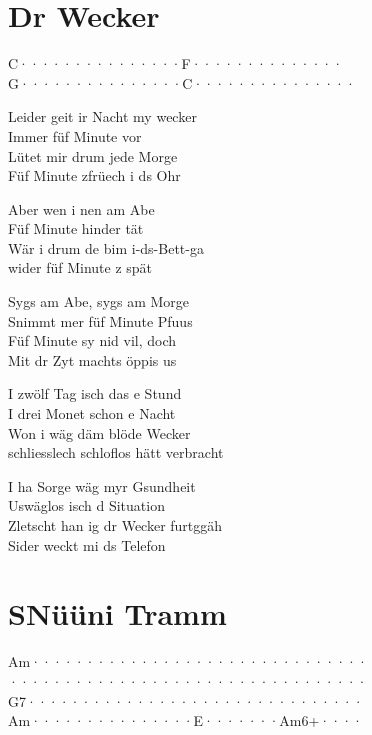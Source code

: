 \documentclass[
  letterpaper,
  a5paper]{memoir}
\begin{document}
\hypertarget{dr-wecker}{%
\chapter{Dr Wecker}\label{dr-wecker}}

\textbar C·······\textbar········\textbar F······\textbar········\textbar{}\\
\textbar G·······\textbar········\textbar C·······\textbar········\textbar{}

Leider geit ir Nacht my wecker\\
Immer füf Minute vor\\
Lütet mir drum jede Morge\\
Füf Minute z\textquotesingle früech i ds Ohr

Aber wen i nen am Abe\\
Füf Minute hinder tät\\
Wär i drum de bim i-ds-Bett-ga\\
wider füf Minute z spät

Syg\textquotesingle s am Abe, syg\textquotesingle s am Morge\\
S\textquotesingle nimmt mer füf Minute Pfuus\\
Füf Minute sy nid vil, doch\\
Mit dr Zyt macht\textquotesingle s öppis us

I zwölf Tag isch das e Stund\\
I drei Monet schon e Nacht\\
Won i wäg däm blöde Wecker\\
schliesslech schloflos hätt verbracht

I ha Sorge wäg myr Gsundheit\\
Uswäglos isch d Situation\\
Zletscht han ig dr Wecker furtggäh\\
Sider weckt mi ds Telefon

\hypertarget{snuxfcuxfcni-tramm}{%
\chapter{S\textquotesingle Nüüni Tramm}\label{snuxfcuxfcni-tramm}}

\textbar Am·······\textbar········\textbar········\textbar········\textbar{}\\
\textbar·········\textbar········\textbar········\textbar········\textbar{}\\
\textbar G7·······\textbar········\textbar········\textbar········\textbar{}\\
\textbar Am·······\textbar········\textbar E·······\textbar Am6+····\textbar{}
\end{document}
